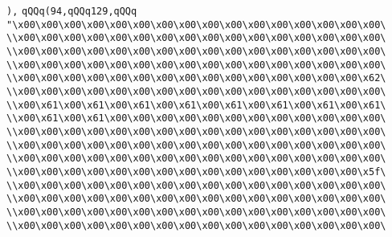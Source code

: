 \verb|),|\newline
\verb|qQQq(94,qQQq129,qQQq|\newline
\verb|"\x00\x00\x00\x00\x00\x00\x00\x00\x00\x00\x00\x00\x00\x00\x00\x00\|\newline
\verb|\\x00\x00\x00\x00\x00\x00\x00\x00\x00\x00\x00\x00\x00\x00\x00\x00\|\newline
\verb|\\x00\x00\x00\x00\x00\x00\x00\x00\x00\x00\x00\x00\x00\x00\x00\x00\|\newline
\verb|\\x00\x00\x00\x00\x00\x00\x00\x00\x00\x00\x00\x00\x00\x00\x00\x00\|\newline
\verb|\\x00\x00\x00\x00\x00\x00\x00\x00\x00\x00\x00\x00\x00\x00\x00\x62\|\newline
\verb|\\x00\x00\x00\x00\x00\x00\x00\x00\x00\x00\x00\x00\x00\x00\x00\x00\|\newline
\verb|\\x00\x61\x00\x61\x00\x61\x00\x61\x00\x61\x00\x61\x00\x61\x00\x61\|\newline
\verb|\\x00\x61\x00\x61\x00\x00\x00\x00\x00\x00\x00\x00\x00\x00\x00\x00\|\newline
\verb|\\x00\x00\x00\x00\x00\x00\x00\x00\x00\x00\x00\x00\x00\x00\x00\x00\|\newline
\verb|\\x00\x00\x00\x00\x00\x00\x00\x00\x00\x00\x00\x00\x00\x00\x00\x00\|\newline
\verb|\\x00\x00\x00\x00\x00\x00\x00\x00\x00\x00\x00\x00\x00\x00\x00\x00\|\newline
\verb|\\x00\x00\x00\x00\x00\x00\x00\x00\x00\x00\x00\x00\x00\x00\x00\x5f\|\newline
\verb|\\x00\x00\x00\x00\x00\x00\x00\x00\x00\x00\x00\x00\x00\x00\x00\x00\|\newline
\verb|\\x00\x00\x00\x00\x00\x00\x00\x00\x00\x00\x00\x00\x00\x00\x00\x00\|\newline
\verb|\\x00\x00\x00\x00\x00\x00\x00\x00\x00\x00\x00\x00\x00\x00\x00\x00\|\newline
\verb|\\x00\x00\x00\x00\x00\x00\x00\x00\x00\x00\x00\x00\x00\x00\x00\x00\|\newline
